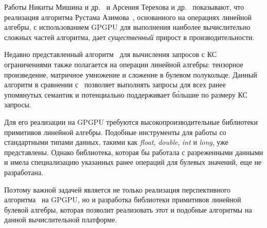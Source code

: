 Работы Никиты Мишина и др.~\cite{inproceedings:cfpq_matrix_evaluation} и Арсения Терехова и др.~\cite{inproceedings:cfqp_matrix_with_single_source} показывают, что реализация алгоритма Рустама Азимова~\cite{inproceedings:matrix_cfpq}, основанного на операциях линейной алгебры, с использованием GPGPU для выполнения наиболее вычислительно сложных частей алгоритма, дает \textit{существенный} прирост в производительности.

Недавно представленный алгоритм~\cite{inbook:kronecker_cfpq_adbis} для вычисления запросов с КС ограничениями также полагается на операции линейной алгебры: тензорное произведение, матричное умножение и сложение в булевом полукольце. Данный алгоритм в сравнении с~\cite{inproceedings:cfqp_matrix_with_single_source} позволяет выполнять запросы для всех ранее упомянутых семантик и потенциально поддерживает б\'ольшие по размеру КС запросы.

Для его реализации на GPGPU требуются высокопроизводительные библиотеки примитивов линейной алгебры. Подобные инструменты для работы со стандартными типами данных, такими как \textit{float}, \textit{double}, \textit{int} и \textit{long}, уже представлены. Однако библиотека, которая бы работала с разреженными данными и имела специализацию указанных ранее операций для булевых значений, еще не разработана. 

Поэтому важной задачей является не только реализация перспективного алгоритма~\cite{inbook:kronecker_cfpq_adbis} на GPGPU, но и разработка библиотеки примитивов линейной булевой алгебры, которая позволит реализовать этот и подобные алгоритмы на данной вычислительной платформе.
